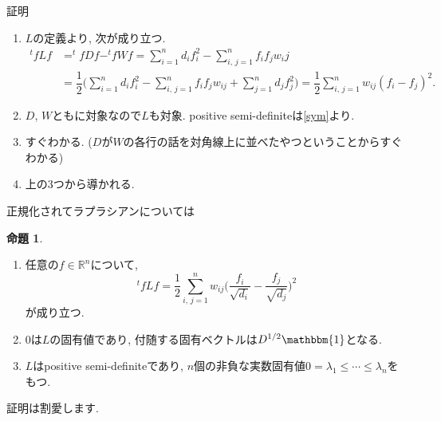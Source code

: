 \documentclass[dvipdfmx,11pt]{beamer}
\makeatletter
\theoremstyle{definition}
\newtheorem{propo}{命題}
\newenvironment{prooff}[1][\proofname]{\par
  \normalfont
  \topsep6\p@\@plus6\p@ \trivlist
  \item[\hskip\labelsep{\bfseries #1}\@addpunct{\bfseries.}]\ignorespaces
  \par
}{%
  \endtrivlist
}
\renewcommand{\proofname}{証明}
\makeatother
\begin{document}
\begin{frame}{証明}

\begin{prooff}


\begin{enumerate}
\item \label{sym}$L$の定義より, 次が成り立つ.
\begin{equation*}
\begin{split}
^{t}f Lf &= ^{t}fDf - ^{t}fWf = \displaystyle\sum _{i=1} ^n d_i f_i ^2 - \displaystyle\sum _{i,\,j=1} ^n f_i f_j w_ij \\
&= \dfrac{1}{2} \biggl( \displaystyle\sum _{i=1} ^n d_i f_i ^2 - \displaystyle\sum _{i,\,j=1} ^n f_i f_j w_{ij} + \displaystyle\sum _{j=1} ^n d_j f_j ^2 \biggr) = \dfrac{1}{2} \displaystyle\sum _{i,\,j=1} ^n w_{ij} (f_i - f_j)^2.
\end{split}
\end{equation*} 
\item $D$, $W$ともに対象なので$L$も対象. positive semi-definiteは\ref{sym}より.
\item すぐわかる. ($D$が$W$の各行の話を対角線上に並べたやつということからすぐわかる)
\item 上の3つから導かれる.
\end{enumerate}
\end{prooff}

\end{frame}

\begin{frame}{正規化されてラプラシアンについては}

\begin{propo}
\begin{enumerate}
\item 任意の$f \in \mathbb{R}^n$について,
$$^{t}f L f = \dfrac{1}{2} \displaystyle\sum _{i,\,j=1} ^n w_{ij} \biggl( \dfrac{f_i}{\sqrt{d_i}} - \dfrac{f_j}{\sqrt{d_j}} \biggr)^2$$
が成り立つ.
\item $0$は$L$の固有値であり, 付随する固有ベクトルは$D^{1/2} \mathbbm{1}$となる.
\item $L$はpositive semi-definiteであり, $n$個の非負な実数固有値$0 = \lambda _1 \leq \cdots \leq \lambda_n$をもつ.
\end{enumerate}
\end{propo}

証明は割愛します.

\end{frame}
\end{document}
